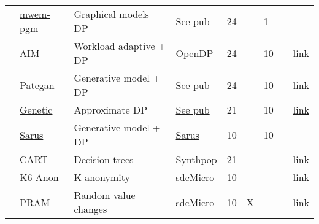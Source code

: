 \begin{table}
\begin{tabular}{lllllllll}
        \cellcolor{ForestGreen} & \href{https://htmlpreview.github.io/?https://github.com/yoid2000/sdnist-summary/blob/main/results/mwem_pgm/report.html}{mwem-pgm} & Graphical models + DP & \href{https://dream.cs.umass.edu/}{See pub} & 24 &   & 1 & \cite{mckenna2019graphical} &  \\
        \cellcolor{ForestGreen} & \href{https://htmlpreview.github.io/?https://github.com/yoid2000/sdnist-summary/blob/main/results/aim_e_10_all/report.html}{AIM} & Workload adaptive + DP & \href{https://opendp.org/}{OpenDP} & 24 &   & 10 & \cite{mckenna2022aim} & \href{https://github.com/opendp/smartnoise-sdk}{link} \\
        \cellcolor{ForestGreen} & \href{https://htmlpreview.github.io/?https://github.com/yoid2000/sdnist-summary/blob/main/results/pategan_n_iter_50_e_10_all/report.html}{Pategan} & Generative model + DP & \href{https://github.com/PerceptionLab-DurhamUniversity/pategan}{See pub} & 24 &   & 10 & \cite{jordon2018pate} & \href{https://github.com/PerceptionLab-DurhamUniversity/pategan}{link} \\
        \cellcolor{YellowGreen} & \href{https://htmlpreview.github.io/?https://github.com/yoid2000/sdnist-summary/blob/main/results/genetic_sd_e_10_simple/report.html}{Genetic} & Approximate DP & \href{https://github.com/giusevtr/private_gsd}{See pub} & 21 &   & 10 & \cite{liu2023generating} & \href{https://github.com/giusevtr/private_gsd}{link} \\
        \cellcolor{YellowGreen} & \href{https://htmlpreview.github.io/?https://github.com/yoid2000/sdnist-summary/blob/main/results/sarus_sdg_demographic/report.html}{Sarus} & Generative model + DP & \href{https://www.sarus.tech/}{Sarus} & 10 &   & 10 & \cite{canale2022generative} &  \\
        \cellcolor{SkyBlue} & \href{https://htmlpreview.github.io/?https://github.com/yoid2000/sdnist-summary/blob/main/results/cart_cf21/report.html}{CART} & Decision trees & \href{https://synthpop.org.uk/}{Synthpop} & 21 &   &  & \cite{nowok2016synthpop} & \href{https://CRAN.R-project.org/package=synthpop}{link} \\
        \cellcolor{Salmon} & \href{https://htmlpreview.github.io/?https://github.com/yoid2000/sdnist-summary/blob/main/results/k_anonymity_k_6/report.html}{K6-Anon} & K-anonymity & \href{https://github.com/sdcTools/sdcMicro}{sdcMicro} & 10 &   &  & \cite{templ2015statistical} & \href{https://github.com/sdcTools/sdcMicro}{link} \\
        \cellcolor{Goldenrod} & \href{https://htmlpreview.github.io/?https://github.com/yoid2000/sdnist-summary/blob/main/results/pram_default/report.html}{PRAM} & Random value changes & \href{https://github.com/sdcTools/sdcMicro}{sdcMicro} & 10 & X &  & \cite{meindl2019feedback} & \href{https://github.com/sdcTools/sdcMicro}{link} \\

\end{tabular}
\end{table}
